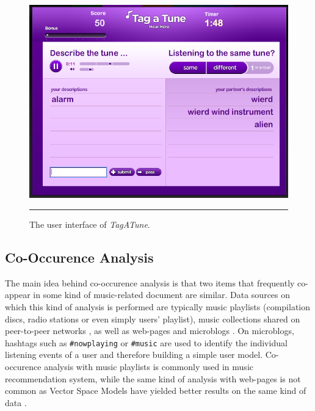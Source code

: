 \begin{figure}
\centering
    \includegraphics[scale=0.5]{Figures/tagatune.png}
    \rule{20em}{0.5pt}
  \caption[TagATune]{The user interface of \textit{TagATune}.}
  \label{fig:Tagatune}
\end{figure} 

\subsection{Co-Occurence Analysis}
The main idea behind co-occurence analysis is that two items that frequently co-appear in some kind of music-related document are similar. Data sources on which this kind of analysis is performed are typically music playlists \cite{pachet01} (compilation discs, radio stations or even simply users' playlist), music collections shared on peer-to-peer networks \cite{whitman02}, as well as web-pages \cite{zadel04} \cite{cohen00} and microblogs \cite{schedlmicro} \cite{zangerle12}. On microblogs, hashtags such as \texttt{#nowplaying} or \texttt{#music} are used to identify the individual listening events of a user and therefore building a simple user model. Co-occurence analysis with music playlists is commonly used in music recommendation system, while the same kind of analysis with web-pages is not common as Vector Space Models have yielded better results on the same kind of data \cite{schedlpohle}.

